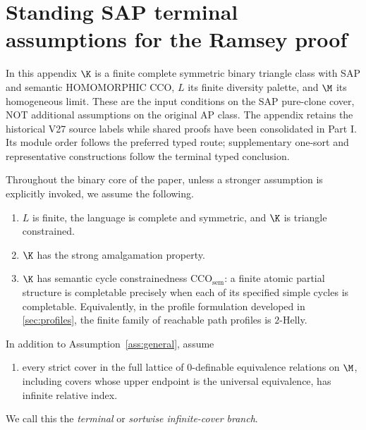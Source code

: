 \section{Standing SAP terminal assumptions for the Ramsey proof}
\label{sec:internal-v27-premises}
In this appendix $\K$ is a finite complete symmetric binary triangle
class with SAP and semantic HOMOMORPHIC CCO, $L$ its finite diversity palette,
and $\M$ its homogeneous limit. These are the input conditions on the
SAP pure-clone cover, NOT additional assumptions on the original AP class.
The appendix retains the historical V27 source labels while shared proofs
have been consolidated in Part I. Its module order follows the preferred
typed route; supplementary one-sort and representative constructions follow
the terminal typed conclusion.


\begin{assumption}\label{ass:general}
Throughout the binary core of the paper, unless a stronger assumption is
explicitly invoked, we assume the following.
\begin{enumerate}[label=(A\arabic*)]
\item \label{A:finite} $L$ is finite, the language is complete and symmetric,
      and $\K$ is triangle constrained.
\item \label{A:sap} $\K$ has the strong amalgamation property.
\item \label{A:cco} $\K$ has semantic cycle constrainedness
      $\mathrm{CCO}_{\mathrm{sem}}$: a finite atomic partial structure is
      completable precisely when each of its specified simple cycles is
      completable.  Equivalently, in the profile formulation developed in
      \cref{sec:profiles}, the finite family of reachable path profiles is
      $2$-Helly.
\end{enumerate}
\end{assumption}

\begin{assumption}\label{ass:standing}
In addition to Assumption~\ref{ass:general}, assume
\begin{enumerate}[label=(A\arabic*),start=4]
\item \label{A:cover} every strict cover in the full lattice of
      $0$-definable equivalence relations on $\M$, including covers whose
      upper endpoint is the universal equivalence, has infinite relative
      index.
\end{enumerate}
We call this the \emph{terminal} or \emph{sortwise infinite-cover branch}.
\end{assumption}

